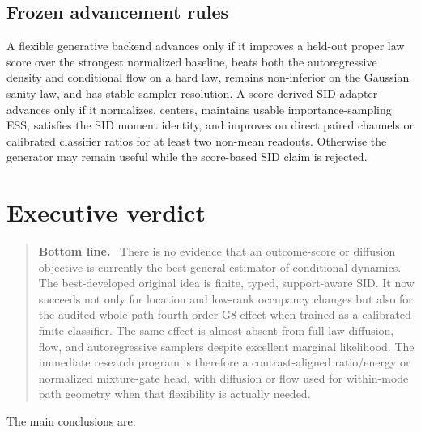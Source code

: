 \documentclass[10pt]{article}
\newenvironment{takeaway}
  {\begin{quote}\color{sidblue}\textbf{Bottom line.}\ }
  {\end{quote}}
\begin{document}
\subsection{Frozen advancement rules}

A flexible generative backend advances only if it improves a held-out proper law
score over the strongest normalized baseline, beats both the autoregressive density
and conditional flow on a hard law, remains non-inferior on the Gaussian sanity law,
and has stable sampler resolution.  A score-derived SID adapter advances only if it
normalizes, centers, maintains usable importance-sampling ESS, satisfies the SID
moment identity, and improves on direct paired channels or calibrated classifier
ratios for at least two non-mean readouts.  Otherwise the generator may remain useful
while the score-based SID claim is rejected.

\section{Executive verdict}

\begin{takeaway}
There is no evidence that an outcome-score or diffusion objective is currently
the best general estimator of conditional dynamics.  The best-developed original
idea is finite, typed, support-aware SID.  It now succeeds not only for location
and low-rank occupancy changes but also for the audited whole-path fourth-order
G8 effect when trained as a calibrated finite classifier.  The same effect is
almost absent from full-law diffusion, flow, and autoregressive samplers despite
excellent marginal likelihood.  The immediate research program is therefore a
contrast-aligned ratio/energy or normalized mixture-gate head, with diffusion or
flow used for within-mode path geometry when that flexibility is actually needed.
\end{takeaway}

The main conclusions are:
\end{document}
